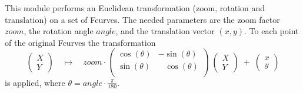 This module performs an Euclidean transformation (zoom, rotation and
translation)
on a set of Fcurves. The needed
parameters are the zoom factor $zoom$, the rotation angle
$angle$, and the translation vector $(x,y)$. To
each point of the original Fcurves the transformation
$$\left( \begin{array}{c} X \\ Y \end{array} \right) \quad
\mapsto \quad zoom \cdot 
\left( \begin{array}{cc}  \cos(\theta) & - \sin(\theta) \\
 \sin(\theta) & \;\;\;\cos(\theta) \\ \end{array} \right) \;
\left( \begin{array}{c} X \\ Y \end{array} \right) \;+\;
\left( \begin{array}{c} x \\ y  \end{array} \right)$$
is applied,
where $\displaystyle \theta = angle \cdot \frac{\pi}{180}$.

